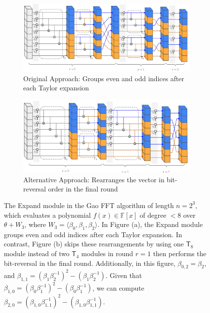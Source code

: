 \begin{figure}
	\centering
	\begin{subfigure}[b]{0.9\linewidth} %
		\centering
		\includegraphics[width=0.9\linewidth]{Figures/Gao_expand.pdf} 
		\caption{ Original Approach: Groups even and odd indices after each Taylor expansion}
		\label{fig:gao-expand-old}
	\end{subfigure}
	\vspace{1em} %
	\begin{subfigure}[b]{0.9\linewidth} %
		\centering
		\includegraphics[width=0.9\linewidth]{Figures/Gao_expand_binary.pdf} 
		\caption{ Alternative Approach: Rearranges the vector in bit-reversal order in the final round}
		\label{fig:gao-expand-binary}
	\end{subfigure}
	
	\caption[The \textsf{Expand} Module in the Gao FFT Algorithm]{The \textsf{Expand} module in the Gao FFT algorithm of length $n=2^3$, which evaluates a polynomial $f(x) \in \mathbb{F}[x]$ of degree $< 8$ over $\theta + W_3$, where $W_3 = \langle \beta_0, \beta_1, \beta_2 \rangle$. 
		In Figure (a), the \textsf{Expand} module groups even and odd indices after each Taylor expansion. In contrast, Figure (b) skips these rearrangements by using one $\textsf{T}_8$ module instead of two $\textsf{T}_4$ modules in round $r=1$ then performs the bit-reversal in the final round. 
		 Additionally, in this figure, $\beta_{0,2} = \beta_2$, and $\beta_{1,1} = (\beta_1 \beta_2^{-1})^2 -  (\beta_1 \beta_2^{-1})$. Given that $\beta_{1,0} = (\beta_0 \beta_1^{-1})^2 -  (\beta_0 \beta_1^{-1})$, we can compute $\beta_{2,0} = (\beta_{1,0} \beta_{1,1}^{-1})^2 -  (\beta_{1,0} \beta_{1,1}^{-1})$.
	}
	
	\label{fig:gao-expand}
\end{figure}


